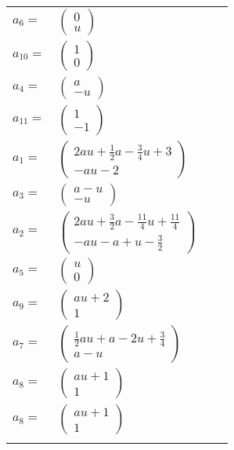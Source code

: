 \documentclass[1p]{elsarticle_modified}
\theoremstyle{definition}
\begin{document}
\begin{tabular}{m{7pt} m{180pt} m{7pt} m{180pt} }
\flushright $a_{6}=$&$\begin{pmatrix}0\\u\end{pmatrix}$ \\
\flushright $a_{10}=$&$\begin{pmatrix}1\\0\end{pmatrix}$ \\
\flushright $a_{4}=$&$\begin{pmatrix}a\\- u\end{pmatrix}$ \\
\flushright $a_{11}=$&$\begin{pmatrix}1\\-1\end{pmatrix}$ \\
\flushright $a_{1}=$&$\begin{pmatrix}2 a u+\frac{1}{2} a-\frac{3}{4} u+3\\- a u-2\end{pmatrix}$ \\
\flushright $a_{3}=$&$\begin{pmatrix}a- u\\- u\end{pmatrix}$ \\
\flushright $a_{2}=$&$\begin{pmatrix}2 a u+\frac{3}{2} a-\frac{11}{4} u+\frac{11}{4}\\- a u- a+u-\frac{3}{2}\end{pmatrix}$ \\
\flushright $a_{5}=$&$\begin{pmatrix}u\\0\end{pmatrix}$ \\
\flushright $a_{9}=$&$\begin{pmatrix}a u+2\\1\end{pmatrix}$ \\
\flushright $a_{7}=$&$\begin{pmatrix}\frac{1}{2} a u+a-2 u+\frac{3}{4}\\a- u\end{pmatrix}$ \\
\flushright $a_{8}=$&$\begin{pmatrix}a u+1\\1\end{pmatrix}$\\ \flushright $a_{8}=$&$\begin{pmatrix}a u+1\\1\end{pmatrix}$\\&\end{tabular}
\end{document}
